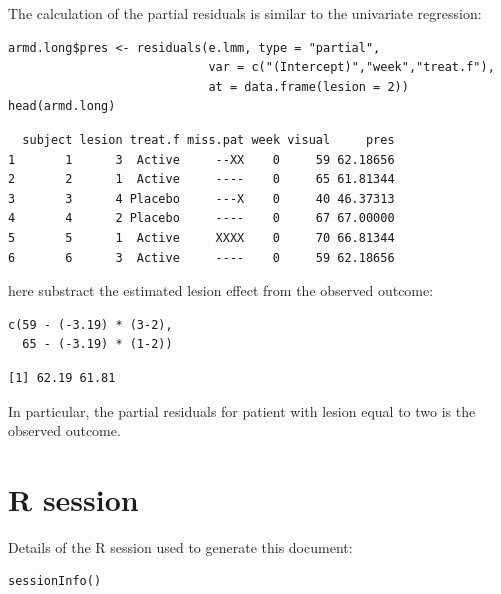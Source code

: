 \documentclass[12pt]{article}
\begin{document}
The calculation of the partial residuals is similar to the univariate regression:
\lstset{language=r,label= ,caption= ,captionpos=b,numbers=none}
\begin{lstlisting}
armd.long$pres <- residuals(e.lmm, type = "partial", 
                            var = c("(Intercept)","week","treat.f"),
                            at = data.frame(lesion = 2))
head(armd.long)
\end{lstlisting}

\begin{verbatim}
  subject lesion treat.f miss.pat week visual     pres
1       1      3  Active     --XX    0     59 62.18656
2       2      1  Active     ----    0     65 61.81344
3       3      4 Placebo     ---X    0     40 46.37313
4       4      2 Placebo     ----    0     67 67.00000
5       5      1  Active     XXXX    0     70 66.81344
6       6      3  Active     ----    0     59 62.18656
\end{verbatim}


here substract the estimated lesion effect from the observed outcome:
\lstset{language=r,label= ,caption= ,captionpos=b,numbers=none}
\begin{lstlisting}
c(59 - (-3.19) * (3-2),
  65 - (-3.19) * (1-2))
\end{lstlisting}

\begin{verbatim}
[1] 62.19 61.81
\end{verbatim}


In particular, the partial residuals for patient with lesion equal to
two is the observed outcome.

\clearpage

\section{R session}
\label{sec:org90e4d45}
Details of the R session used to generate this document:
\lstset{language=r,label= ,caption= ,captionpos=b,numbers=none}
\begin{lstlisting}
sessionInfo()
\end{lstlisting}
\end{document}
